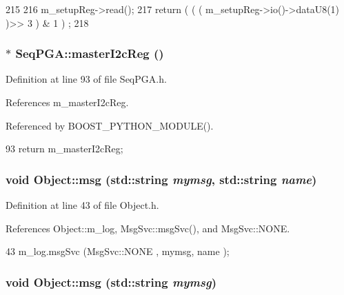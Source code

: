 \begin{DoxyCode}
215                        {
216   m_setupReg->read();
217   return ( ( ( m_setupReg->io()->dataU8(1) )>> 3 ) & 1 ) ;
218 }
\end{DoxyCode}
\hypertarget{classSeqPGA_a3906fe0cdfd9042a67c0fa35ae75147a}{
\subsubsection[{masterI2cReg}]{$\ast$ SeqPGA::masterI2cReg ()}}
\label{classSeqPGA_a3906fe0cdfd9042a67c0fa35ae75147a}


Definition at line 93 of file SeqPGA.h.

References m\_\-masterI2cReg.

Referenced by BOOST\_\-PYTHON\_\-MODULE().


\begin{DoxyCode}
93 { return m_masterI2cReg; }
\end{DoxyCode}
\hypertarget{classObject_ac5d59299273cee27aacf7de00d2e7034}{
\subsubsection[{msg}]{\setlength{\rightskip}{0pt plus 5cm}void Object::msg (std::string {\em mymsg}, \/  std::string {\em name})}}
\label{classObject_ac5d59299273cee27aacf7de00d2e7034}


Definition at line 43 of file Object.h.

References Object::m\_\-log, MsgSvc::msgSvc(), and MsgSvc::NONE.


\begin{DoxyCode}
43 { m_log.msgSvc (MsgSvc::NONE    , mymsg, name ); }
\end{DoxyCode}
\hypertarget{classObject_a58b2d0618c2d08cf2383012611528d97}{
\subsubsection[{msg}]{\setlength{\rightskip}{0pt plus 5cm}void Object::msg (std::string {\em mymsg})}}
\label{classObject_a58b2d0618c2d08cf2383012611528d97}


